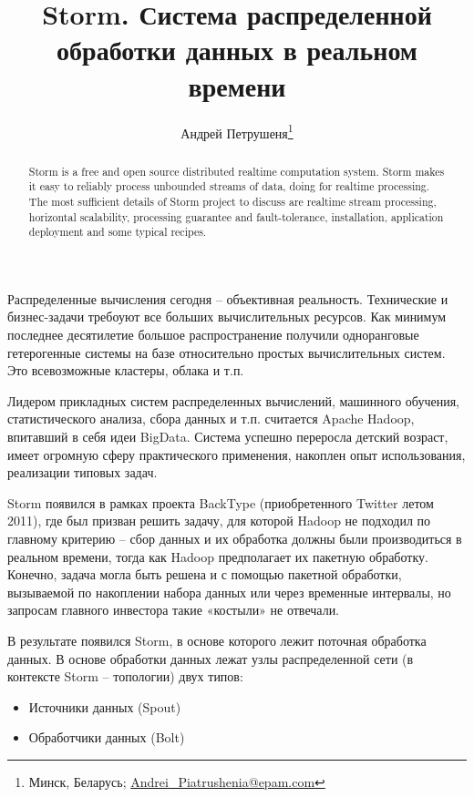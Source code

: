 \documentclass[10pt, a5paper]{article}
\begin{document}
\title{Storm. Система распределенной обработки данных в реальном времени}
\author{Андрей Петрушеня\footnote{Минск, Беларусь; \url{Andrei_Piatrushenia@epam.com}}}
\maketitle
\begin{abstract}
Storm is a free and open source distributed realtime computation system. Storm makes it easy to reliably process unbounded \linebreak streams of data, doing for realtime processing.
The most sufficient details of Storm project to discuss are realtime stream processing, horizontal scalability, processing guarantee and fault-tolerance, installation, application deployment and some typical recipes. 
\end{abstract}
Распределенные вычисления сегодня -- объективная реальность. \linebreak Технические и бизнес-задачи требоуют все больших вычислительных ресурсов. Как минимум последнее десятилетие большое распространение получили одноранговые гетерогенные системы на базе относительно простых вычислительных систем. Это всевозможные кластеры, облака и т.п.

Лидером прикладных систем распределенных вычислений, машинного обучения, статистического анализа, сбора данных и т.п. считается Apache Hadoop, впитавший в себя идеи BigData. Система успешно переросла детский возраст, имеет огромную сферу практического применения, накоплен опыт использования, реализации типовых задач.

Storm появился в рамках проекта BackType (приобретенного Twitter летом 2011), где был призван решить задачу, для которой Hadoop не подходил по главному критерию – сбор данных и их обработка должны были производиться в реальном времени, тогда как Hadoop предполагает их пакетную обработку. Конечно, задача могла быть решена и с помощью пакетной обработки, вызываемой по накоплении набора данных или через временные интервалы, но запросам главного инвестора такие «костыли» не отвечали.

В результате появился Storm, в основе которого лежит поточная обработка данных. 
В основе обработки данных лежат узлы распределенной сети (в контексте Storm – топологии) двух типов:
\begin{itemize}
\item Источники данных (Spout)
\item Обработчики данных (Bolt)
\end{itemize}
\end{document}
